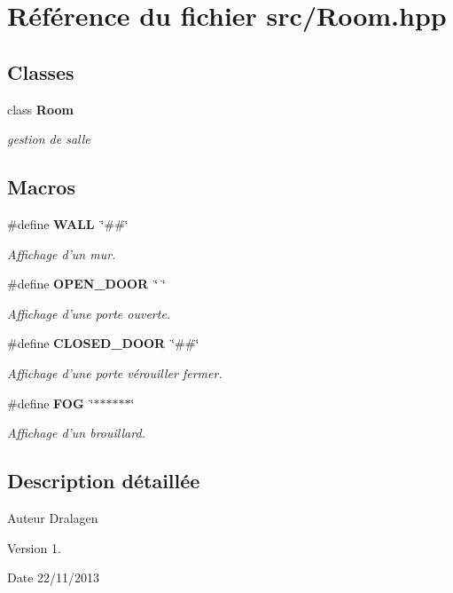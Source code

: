 \section{Référence du fichier src/\-Room.hpp}
\label{_room_8hpp}
\subsection*{Classes}
\begin{DoxyCompactItemize}
\item 
class {\bf Room}
\begin{DoxyCompactList}\small\item\em gestion de salle \end{DoxyCompactList}\end{DoxyCompactItemize}
\subsection*{Macros}
\begin{DoxyCompactItemize}
\item 
\#define {\bf W\-A\-L\-L}~\char`\"{}\#\#\char`\"{}
\begin{DoxyCompactList}\small\item\em Affichage d'un mur. \end{DoxyCompactList}\item 
\#define {\bf O\-P\-E\-N\-\_\-\-D\-O\-O\-R}~\char`\"{}  \char`\"{}
\begin{DoxyCompactList}\small\item\em Affichage d'une porte ouverte. \end{DoxyCompactList}\item 
\#define {\bf C\-L\-O\-S\-E\-D\-\_\-\-D\-O\-O\-R}~\char`\"{}\#\#\char`\"{}
\begin{DoxyCompactList}\small\item\em Affichage d'une porte vérouiller fermer. \end{DoxyCompactList}\item 
\#define {\bf F\-O\-G}~\char`\"{}$\ast$$\ast$$\ast$$\ast$$\ast$$\ast$\char`\"{}
\begin{DoxyCompactList}\small\item\em Affichage d'un brouillard. \end{DoxyCompactList}\end{DoxyCompactItemize}


\subsection{Description détaillée}
\begin{DoxyAuthor}{Auteur}
Dralagen 
\end{DoxyAuthor}
\begin{DoxyVersion}{Version}
1. 
\end{DoxyVersion}
\begin{DoxyDate}{Date}
22/11/2013 
\end{DoxyDate}


